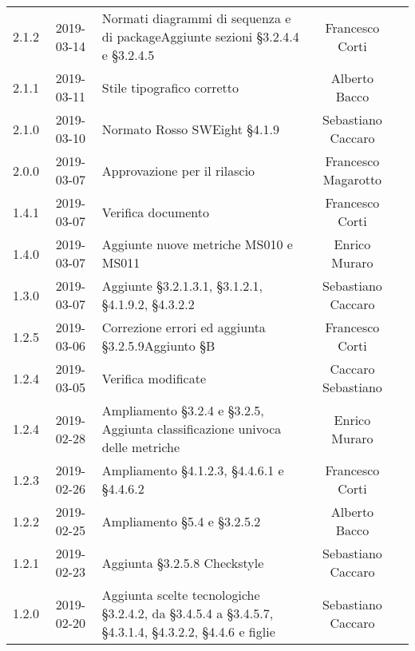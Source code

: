 {\begin{longtable}{ c c C{4cm} c c }
		2.1.2 & 2019-03-14 & Normati diagrammi di sequenza e di package\newline Aggiunte sezioni §3.2.4.4 e §3.2.4.5 & Francesco Corti & \reda{} \\	
		
		2.1.1 & 2019-03-11 & Stile tipografico corretto & Alberto Bacco & \reda{} \\	
		
		2.1.0 & 2019-03-10 & Normato Rosso SWEight §4.1.9 & Sebastiano Caccaro & \reda{} \\			
		
		2.0.0 & 2019-03-07 & Approvazione per il rilascio & Francesco Magarotto & \Res{} \\		
		
		1.4.1 & 2019-03-07 & Verifica documento & Francesco Corti & \ver{} \\	
		
		1.4.0 & 2019-03-07 & Aggiunte nuove metriche MS010 e MS011 & Enrico Muraro & \reda{} \\
		
		1.3.0 & 2019-03-07 & Aggiunte §3.2.1.3.1, §3.1.2.1, §4.1.9.2, §4.3.2.2 & Sebastiano Caccaro & \reda{} \\
		
		1.2.5 & 2019-03-06 & Correzione errori ed aggiunta §3.2.5.9\newline Aggiunto §B & Francesco Corti & \reda{} \\
		
		1.2.4 & 2019-03-05 & Verifica modificate & Caccaro Sebastiano & \ver{} \\		
		
		1.2.4 & 2019-02-28 & Ampliamento §3.2.4 e §3.2.5, Aggiunta classificazione univoca delle metriche & Enrico Muraro & \reda{} \\
		
		1.2.3 & 2019-02-26 & Ampliamento §4.1.2.3, §4.4.6.1 e §4.4.6.2 & Francesco Corti & \reda{} \\	
		
		1.2.2 & 2019-02-25 & Ampliamento §5.4 e §3.2.5.2 & Alberto Bacco & \reda{} \\
		
		1.2.1 & 2019-02-23 & Aggiunta §3.2.5.8 Checkstyle & Sebastiano Caccaro & \reda{} \\		
		
		1.2.0 & 2019-02-20 & Aggiunta scelte tecnologiche §3.2.4.2, da §3.4.5.4 a §3.4.5.7, §4.3.1.4, §4.3.2.2, §4.4.6 e figlie & Sebastiano Caccaro & \reda{} \\	
		

\end{longtable}}
